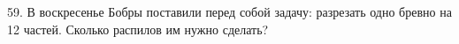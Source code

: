 59. В воскресенье Бобры поставили перед собой задачу: разрезать одно бревно на 12 частей. Сколько распилов им нужно сделать?\\
